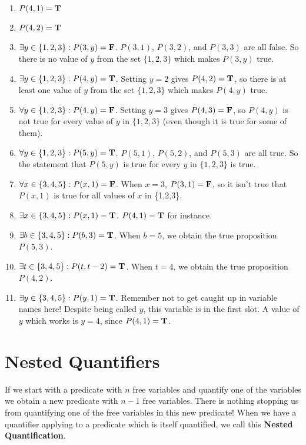 \begin{solutions}



		\begin{enumerate}
	\item $P(4,1) = \textbf{\textrm{T}}$
	\item $P(4,2) = \textbf{\textrm{T}} $
	\item $\exists y \in \{1,2,3\}: P(3,y) = \textbf{\textrm{F}}$.  $P(3,1)$, $P(3,2)$, and $P(3,3)$ are all false.  So there is no value of $y$ from the set $\{1,2,3\}$ which makes $P(3,y)$ true.
	\item $\exists y  \in \{1,2,3\}: P(4,y) = \textbf{\textrm{T}}$.  Setting $y=2$ gives $P(4,2) = \textbf{\textrm{T}}$, so there is at least one value of $y$ from the set $\{1,2,3\}$ which makes $P(4,y)$ true.
	\item $\forall y  \in \{1,2,3\}: P(4,y) = \textbf{\textrm{F}}$. Setting  $y = 3$ gives $P(4,3) = \textbf{\textrm{F}}$, so $P(4,y)$ is not true for every value of $y$ in $\{1,2,3\}$ (even though it is true for some of them).
	\item $\forall y  \in \{1,2,3\}: P(5,y) = \textbf{\textrm{T}}$.  $P(5,1)$, $P(5,2)$, and $P(5,3)$ are all true.  So the statement that $P(5,y)$ is true for every $y$ in $\{1,2,3\}$ is true.
	\item $\forall x  \in \{3,4,5\}: P(x, 1) = \textbf{\textrm{F}}$.  When $x = 3$, $P(3, 1) = \textbf{\textrm{F}}$, so it isn't true that $P(x,1)$ is true for all values of $x$ in \{1,2,3\}.
	\item $\exists x  \in \{3,4,5\}: P(x,1) = \textbf{\textrm{T}}$.  $P(4,1) = \textbf{\textrm{T}}$ for instance.
	\item $\exists b  \in \{3,4,5\}: P(b, 3) = \textbf{\textrm{T}}$.  When $b = 5$, we obtain the true proposition $P(5,3)$.
	\item $\exists t  \in \{3,4,5\}: P(t, t-2) = \textbf{\textrm{T}}$.  When $t = 4$, we obtain the true proposition $P(4,2)$.  
	\item $\exists y  \in \{3,4,5\}: P(y,1) = \textbf{\textrm{T}}$.  Remember not to get caught up in variable names here!  Despite being called $y$, this variable is in the first slot.  A value of $y$ which works is $y = 4$, since $P(4,1) = \textbf{\textrm{T}}$. 
\end{enumerate}
	
	\end{solutions}

\section{Nested Quantifiers}

If we start with a predicate with $n$ free variables and quantify one of the variables we obtain a new predicate with $n-1$ free variables.  There is nothing stopping us from quantifying one of the free variables in this new predicate!  When we have a quantifier applying to a predicate which is itself quantified, we call this  \textbf{Nested Quantification}.

